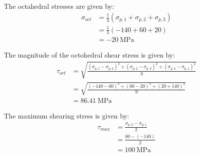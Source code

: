 \subsection{}
The octahedral stresses are given by:
\begin{align*}
    \sigma_{oct} &= \frac{1}{3}(\sigma_{p, 1} + \sigma_{p, 2} + \sigma_{p, 3}) \\
    &= \frac{1}{3}(-140 + 60 + 20) \\
    &= \boxed{\qty{-20}{\mega\pascal}}
\end{align*}

The magnitude of the octohedral shear stress is given by:
\begin{align*}
    \tau_{oct} &= \sqrt{\frac{(\sigma_{p, 1} - \sigma_{p, 2})^2 + (\sigma_{p, 2} - \sigma_{p, 3})^2 + (\sigma_{p, 3} - \sigma_{p, 1})^2}{9}} \\
    &= \sqrt{\frac{(-140 - 60)^2 + (60 - 20)^2 + (20 + 140)^2}{9}} \\
    &= \boxed{\qty{86.41}{\mega\pascal}}
\end{align*}

The maximum shearing stress is given by:
\begin{align*}
    \tau_{max} &= \frac{\sigma_{p, 2} - \sigma_{p, 1}}{2} \\
    &= \frac{60 - (-140)}{2} \\
    &= \boxed{\qty{100}{\mega\pascal}}
\end{align*}





